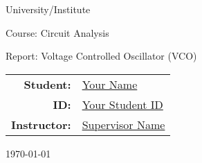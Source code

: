 \begin{titlepage}
\centering
{\Large University/Institute}\par
{\Large Course: Circuit Analysis}\par\vspace{2cm}
{\LARGE Report: Voltage Controlled Oscillator (VCO)}\par\vspace{1.5cm}
\begin{tabular}{rl}
\textbf{Student:} & \underline{Your Name} \\
\textbf{ID:} & \underline{Your Student ID} \\
\textbf{Instructor:} & \underline{Supervisor Name} \\
\end{tabular}
\vfill
{\large \today}
\end{titlepage}


